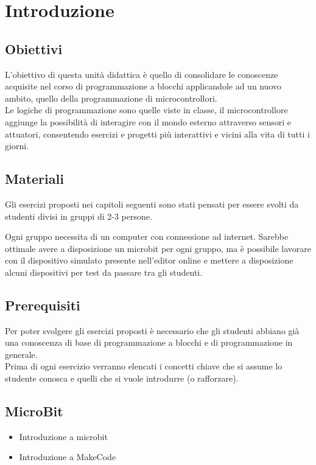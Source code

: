 \documentclass[../../main.tex]{subfiles}
\begin{document}
\section{Introduzione}

\subsection{Obiettivi}
L'obiettivo di questa unità didattica è quello di consolidare le conoscenze acquisite nel corso di programmazione a blocchi applicandole ad un nuovo ambito, quello della programmazione di microcontrollori.\\
Le logiche di programmazione sono quelle viste in classe, il microcontrollore aggiunge la possibilità di interagire con il mondo esterno attraverso sensori e attuatori, consentendo esercizi e progetti più interattivi e vicini alla vita di tutti i giorni. 


\subsection{Materiali}
Gli esercizi proposti nei capitoli seguenti sono stati pensati per essere svolti da studenti divisi in gruppi di 2-3 persone.

Ogni gruppo necessita di un computer con connessione ad internet. Sarebbe ottimale avere a disposizione un microbit per ogni gruppo, ma è possibile lavorare con il dispositivo simulato presente nell'editor online e mettere a disposizione alcuni dispositivi per test da passare tra gli studenti.

\subsection{Prerequisiti}
Per poter svolgere gli esercizi proposti è necessario che gli studenti abbiano già una conoscenza di base di programmazione a blocchi e di programmazione in generale.\\
Prima di ogni esercizio verranno elencati i concetti chiave che si assume lo studente conosca e quelli che si vuole introdurre (o rafforzare).

\subsection{MicroBit}

\begin{itemize}
	\item Introduzione a microbit 
	\item Introduzione a MakeCode
\end{itemize}
\end{document}
